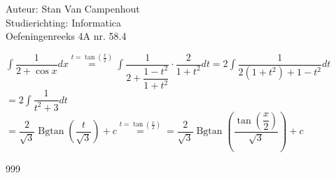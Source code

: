 \documentclass[a4paper]{article}
\begin{document}
  
\noindent \large Auteur: Stan Van Campenhout \\
\noindent \large Studierichting:  Informatica\\
\noindent \large Oefeningenreeks 4A nr. 58.4\\

\medskip

\normalsize

$ \displaystyle\int\dfrac{1}{2+\cos x}dx \stackrel{t = \tan\left(\tfrac{x}{2}\right)}{=} \displaystyle\int\dfrac{1}{2+\dfrac{1-t^2}{1+t^2}}\cdot\dfrac{2}{1+t^2}dt
= 2\displaystyle\int\dfrac{1}{2\left(1+t^2\right)+1-t^2}dt $\\

$ = 2\displaystyle\int\dfrac{1}{t^2+3}dt $\\

$ = \dfrac{2}{\sqrt{3}}\operatorname{Bgtan}\left(\dfrac{t}{\sqrt{3}}\right) + c \stackrel{t = \tan\left(\tfrac{x}{2}\right)}{=} 
=  \dfrac{2}{\sqrt{3}}\operatorname{Bgtan}\left(\dfrac{\tan\left(\dfrac{x}{2}\right)}{\sqrt{3}}\right) + c $\\

\begin{thebibliography}{999}
\end{thebibliography}
\end{document}
